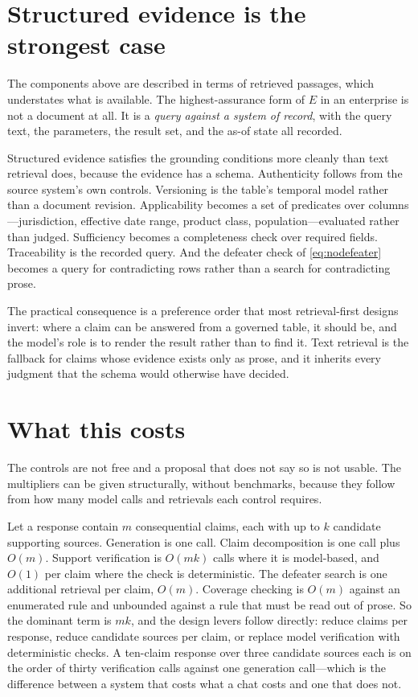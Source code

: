 \section{Structured evidence is the strongest case}
\label{sec:structured}

The components above are described in terms of retrieved passages, which
understates what is available. The highest-assurance form of $E$ in an enterprise is
not a document at all. It is a \emph{query against a system of record}, with the query
text, the parameters, the result set, and the as-of state all recorded.

Structured evidence satisfies the grounding conditions more cleanly than text
retrieval does, because the evidence has a schema. Authenticity follows from the source
system's own controls. Versioning is the table's temporal model rather than a document
revision. Applicability becomes a set of predicates over columns---jurisdiction,
effective date range, product class, population---evaluated rather than judged.
Sufficiency becomes a completeness check over required fields. Traceability is the
recorded query. And the defeater check of \eqref{eq:nodefeater} becomes a query for
contradicting rows rather than a search for contradicting prose.

The practical consequence is a preference order that most retrieval-first designs
invert: where a claim can be answered from a governed table, it should be, and the
model's role is to render the result rather than to find it. Text retrieval is the
fallback for claims whose evidence exists only as prose, and it inherits every
judgment that the schema would otherwise have decided.

\section{What this costs}
\label{sec:cost}

The controls are not free and a proposal that does not say so is not usable. The
multipliers can be given structurally, without benchmarks, because they follow from how
many model calls and retrievals each control requires.

Let a response contain $m$ consequential claims, each with up to $k$ candidate
supporting sources. Generation is one call. Claim decomposition is one call plus $O(m)$.
Support verification is $O(mk)$ calls where it is model-based, and $O(1)$ per claim where
the check is deterministic. The defeater search is one additional retrieval per claim,
$O(m)$. Coverage checking is $O(m)$ against an enumerated rule and unbounded against a
rule that must be read out of prose. So the dominant term is $mk$, and the design levers
follow directly: reduce claims per response, reduce candidate sources per claim, or
replace model verification with deterministic checks. A ten-claim response over three
candidate sources each is on the order of thirty verification calls against one
generation call---which is the difference between a system that costs what a chat costs
and one that does not.

